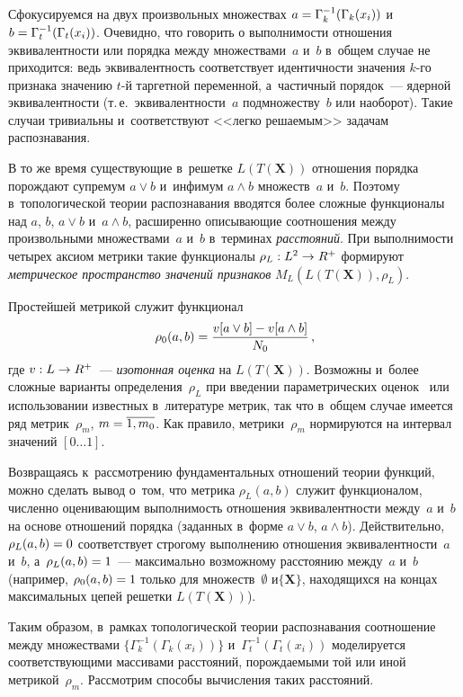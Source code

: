 \begin{multicols}{2}
     Сфокусируемся на двух произвольных множествах $a\hm= \Gamma_k^{-
1}(\Gamma_k(x_i))$ и~$b\hm= \Gamma_t^{-1}(\Gamma_t(x_i))$. Очевидно, что 
говорить о выполнимости отношения эквивалентности или порядка между 
множествами~$a$ и~$b$ в~общем случае не приходится: ведь эквивалентность 
соответствует идентичности значения $k$-го признака значению $t$-й 
таргетной переменной, а~час\-тич\-ный  
порядок~--- ядерной эквивалентности (т.\,е.\ эквивалентности~$a$ 
подмножеству~$b$ или наоборот). Такие случаи тривиальны и~соответствуют 
<<легко решаемым>> задачам распознавания.
     
     В то же время существующие в~решетке $L(T(\mathbf{X}))$ отношения 
порядка порождают супремум $a\vee b$ и~инфимум $a\wedge b$ множеств~$a$ 
и~$b$. Поэтому в~топологической теории распознавания вводятся более\linebreak 
сложные функционалы над $a$, $b$, $a\vee b$ и~$a\wedge b$, расширенно 
описывающие соотношения между произвольными множествами~$a$ и~$b$ 
в~терминах \textit{расстояний}. При выполнимости четырех аксиом \mbox{мет\-ри\-ки} такие 
функционалы $\rho_L: L^2\hm\to R^+$ формируют \textit{метрическое 
пространство значений признаков} $M_L(L(T(\mathbf{X})), \rho_L)$.
     
     Простейшей метрикой служит функционал 
     $$
     \rho_0(a,b) \hm= \fr{v[a\vee b] 
\hm- v[a\wedge b]}{N_0}\,,
$$
 где $v: L\hm\to R^+$~--- \textit{изотонная оценка} на 
$L(T(\mathbf{X}))$. Возможны и~более сложные варианты 
определения~$\rho_L$ при введении параметрических оценок~\cite{4-tr} или 
использовании известных в~литературе метрик, так что в~общем случае имеется 
ряд метрик~$\rho_m$, $m\hm=\overline{1, m_0}$. Как правило, метрики~$\rho_m$ 
нормируются на интервал значений $[0\ldots 1]$.
     
     Возвращаясь к~рассмотрению фундаментальных отношений теории 
функций, можно сделать вывод о~том, что метрика $\rho_L(a,b)$ служит 
функционалом, численно оценивающим выполнимость отношения 
эквивалентности между~$a$ и~$b$ на основе отношений порядка (заданных 
в~форме $a\vee b$, $a\wedge b$). Действительно, $\rho_L(a,b)\hm=0$ 
соответствует строгому выполнению отношения эквивалентности~$a$ и~$b$, 
а~$\rho_L(a,b)\hm=1$~--- максимально возможному расстоянию между~$a$ 
и~$b$ (например, $\rho_0(a,b)\hm=1$ только для множеств~$\emptyset$ 
и$\{\mathbf{X}\}$, находящихся на концах максимальных цепей решетки 
$L(T(\mathbf{X}))$). 
     
     Таким образом, в~рамках топологической тео\-рии распознавания 
соотношение между множествами $\{\Gamma_k^{-1}(\Gamma_k(x_i))\}$  
и~$\Gamma_t^{-1}(\Gamma_t(x_i))$ моделируется соответствующими 
массивами расстояний, по\-рож\-да\-емы\-ми той или иной метрикой~$\rho_m$. 
Рассмотрим способы вычисления таких расстояний.


\end{multicols}
